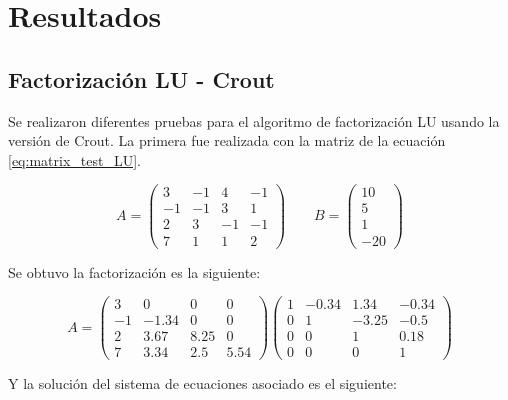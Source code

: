 \section{Resultados}

\subsection{Factorización LU - Crout}

Se realizaron diferentes pruebas para el algoritmo de factorización LU usando la versión de Crout. La primera fue realizada con la matriz de la ecuación \ref{eq:matrix_test_LU}.

\begin{equation}
    A= \begin{pmatrix}
        3  & -1 & 4  & -1 \\
        -1 & -1 & 3  & 1  \\
        2  & 3  & -1 & -1 \\
        7  & 1  & 1  & 2
    \end{pmatrix} \qquad
    B = \begin{pmatrix}
        10 \\
        5  \\
        1  \\
        -20
    \end{pmatrix}
    \label{eq:matrix_test_LU}
\end{equation}

Se obtuvo la factorización es la siguiente:

\begin{equation}
    A = \begin{pmatrix}
        3  & 0     & 0    & 0    \\
        -1 & -1.34 & 0    & 0    \\
        2  & 3.67  & 8.25 & 0    \\
        7  & 3.34  & 2.5  & 5.54
    \end{pmatrix}
    \begin{pmatrix}
        1 & -0.34 & 1.34  & -0.34 \\
        0 & 1     & -3.25 & -0.5  \\
        0 & 0     & 1     & 0.18  \\
        0 & 0     & 0     & 1
    \end{pmatrix}
\end{equation}


Y la solución del sistema de ecuaciones asociado es el siguiente:

